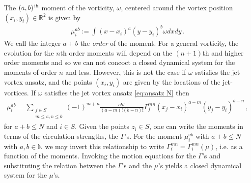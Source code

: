 \documentclass[12pt]{amsart}
\newcommand{\R}{\ensuremath{\mathbb{R}}}
\theoremstyle{remark}
\begin{document}
	The $(a,b)^{\rm th}$ moment of the vorticity, $\omega$, centered around the vortex position $(x_i,y_i) \in \R^2$ is given by
	\begin{align*}
		\mu^{ab}_i := \int (x-x_i)^a (y-y_i)^b \omega dxdy\,.
	\end{align*}
	We call the integer $a+b$ the \emph{order} of the moment.
	For a general vorticity, the evolution for the $n$th order moments will depend on the $(n+1)$th and higher order moments
	and so we can not concoct a closed dynamical system for the moments of order $n$ and less.
	However, this is not the case if $\omega$ satisfies the jet vortex ansatz, and the points $(x_i,y_i)$ are given by the locations of the jet-vortices.
	If $\omega$ satisfies the jet vortex ansatz \eqref{eq:ansatz N} then
	\begin{align*}
		\mu^{ab}_i = \sum_{
			\substack{
				j \in S \\
				m \leq a ,
				n \leq b
			}
		}
		(-1)^{m+n} \frac{a! b!}{(a-m)!(b-n)!} \Gamma_j^{mn} (x_j - x_i)^{a-m} (y_j - y_i)^{b-n}\,,
	\end{align*}
	for $a+b \leq N$ and $i \in S$.
	Given the points $z_i \in S$, one can write the moments in terms of the circulation
	strengths, the $\Gamma$'s.
	For the moment $\mu_i^{ab}$ with $a+b \leq N$ with $a,b \in \mathbb{N}$
	we may invert this relationship to write $\Gamma_i^{mn} = \Gamma_i^{mn}( \mu)$, i.e. as a function of the moments.
	Invoking the motion equations for the $\Gamma$'s and substituting the relation between the $\Gamma$'s and the $\mu$'s yields a closed dynamical system for the $\mu$'s.
	
\end{document}
